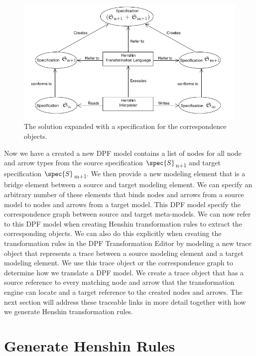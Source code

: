 \begin{figure}[H]
	\centering
	\includegraphics[scale=0.7]{./Figures/TransformationSolution_Correspond.png}
	\caption[Specification for the correspondence objects]
	{The solution expanded with a specification for the correspondence objects.}
	\label{fig:Solution_CorrespondanceObjects}
\end{figure}

Now we have a created a new DPF model contains a list of nodes for all node and
arrow types from the source specification $\spec{S}$\textsubscript{n+1} and
target specification $\spec{S}$\textsubscript{m+1}. We then provide a new
modeling element that is a bridge element between a source and target modeling
element. We can specify an arbitrary number of these elements that binds nodes
and arrows from a source model to nodes and arrows from a target model. This DPF
model specify the correspondence graph between source and target meta-models. We
can now refer to this DPF model when creating Henshin transformation rules to
extract the corresponding objects. We can also do this explicitly when creating
the transformation rules in the DPF Transformation Editor by modeling a new trace
object that represents a trace between a source modeling element and a
target modeling element. We use this trace object or the correspondence graph to
determine how we translate a DPF model. We create a trace object that has a
source reference to every matching node and arrow that the transformation engine
can locate and a target reference to the created nodes and arrows. The next
section will address these traceable links in more detail together with how we
generate Henshin transformation rules. 


\section{Generate Henshin Rules}
\label{hensin_rules}

